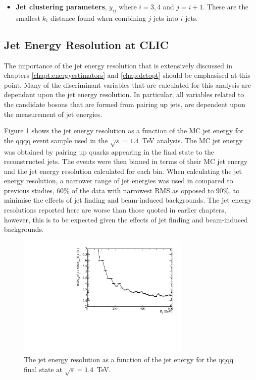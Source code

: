 \begin{itemize}
\item \textbf{Jet clustering parameters}, $y_{ij}$ where $i = 3,4$ and $j=i+1$.  These are the smallest $k_{t}$ distance found when combining $j$ jets into $i$ jets.  
\end{itemize}


\subsection{Jet Energy Resolution at CLIC} 
\label{sec:jetenergyresolution}
The importance of the jet energy resolution that is extensively discussed in chapters \ref{chapt:energyestimators} and \ref{chap:detopt} should be emphasised at this point.  Many of the discriminant variables that are calculated for this analysis are dependant upon the jet energy resolution.  In particular, all variables related to the candidate bosons that are formed from pairing up jets, are dependent upon the measurement of jet energies.  

Figure \ref{fig:jeteenrgyresolutionphysicsanalysis} shows the jet energy resolution as a function of the MC jet energy for the {\nu}{\nu}qqqq event sample used in the $\sqrt{s}=1.4$~TeV analysis.  The MC jet energy was obtained by pairing up quarks appearing in the final state to the reconstructed jets.  The events were then binned in terms of their MC jet energy and the jet energy resolution calculated for each bin.  When calculating the jet energy resolution, a narrower range of jet energies was used in compared to previous studies, 60\% of the data with narrowest RMS as opposed to 90\%, to minimise the effects of jet finding and beam-induced backgrounds.  The jet energy resolutions reported here are worse than those quoted in earlier chapters, however, this is to be expected given the effects of jet finding and beam-induced backgrounds.

\begin{figure}
\centering
\includegraphics[width=0.75\textwidth]{PhysicsAnalysis/Plots/JetEnergyResolution/JetEnergyResolutionScan_1400GeV.pdf}
\caption[The jet energy resolution as a function of the jet energy for the {\nu}{\nu}qqqq final state at $\sqrt{s}=1.4$~TeV.]{The jet energy resolution as a function of the jet energy for the {\nu}{\nu}qqqq final state at $\sqrt{s}=1.4$~TeV.}
\label{fig:jeteenrgyresolutionphysicsanalysis}
\end{figure}

